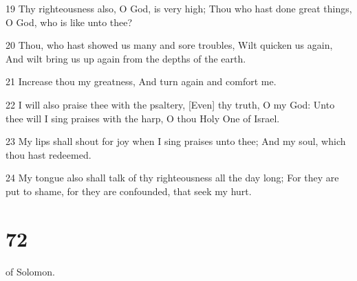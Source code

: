 \par 19 Thy righteousness also, O God, is very high; Thou who hast done great things, O God, who is like unto thee?
\par 20 Thou, who hast showed us many and sore troubles, Wilt quicken us again, And wilt bring us up again from the depths of the earth.
\par 21 Increase thou my greatness, And turn again and comfort me.
\par 22 I will also praise thee with the psaltery, [Even] thy truth, O my God: Unto thee will I sing praises with the harp, O thou Holy One of Israel.
\par 23 My lips shall shout for joy when I sing praises unto thee; And my soul, which thou hast redeemed.
\par 24 My tongue also shall talk of thy righteousness all the day long; For they are put to shame, for they are confounded, that seek my hurt.

\chapter{72}

\par [A Psalm] of Solomon.

